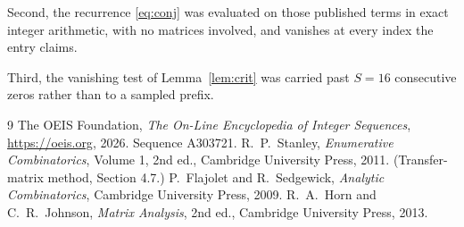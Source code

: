\documentclass[11pt,a4paper]{article}
\theoremstyle{plain}
\theoremstyle{definition}
\begin{document}
Second, the recurrence \eqref{eq:conj} was evaluated on those published terms in exact
integer arithmetic, with no matrices involved, and vanishes at every index the entry claims.

Third, the vanishing test of Lemma~\ref{lem:crit} was carried past $S=16$ consecutive
zeros rather than to a sampled prefix.

\begin{thebibliography}{9}
 The OEIS Foundation, \emph{The On-Line Encyclopedia of Integer
Sequences}, \url{https://oeis.org}, 2026. Sequence A303721.
 R.~P.~Stanley, \emph{Enumerative Combinatorics}, Volume 1, 2nd ed.,
Cambridge University Press, 2011. (Transfer-matrix method, Section 4.7.)
 P.~Flajolet and R.~Sedgewick, \emph{Analytic Combinatorics}, Cambridge
University Press, 2009.
 R.~A.~Horn and C.~R.~Johnson, \emph{Matrix Analysis}, 2nd ed., Cambridge
University Press, 2013.
\end{thebibliography}
\end{document}
